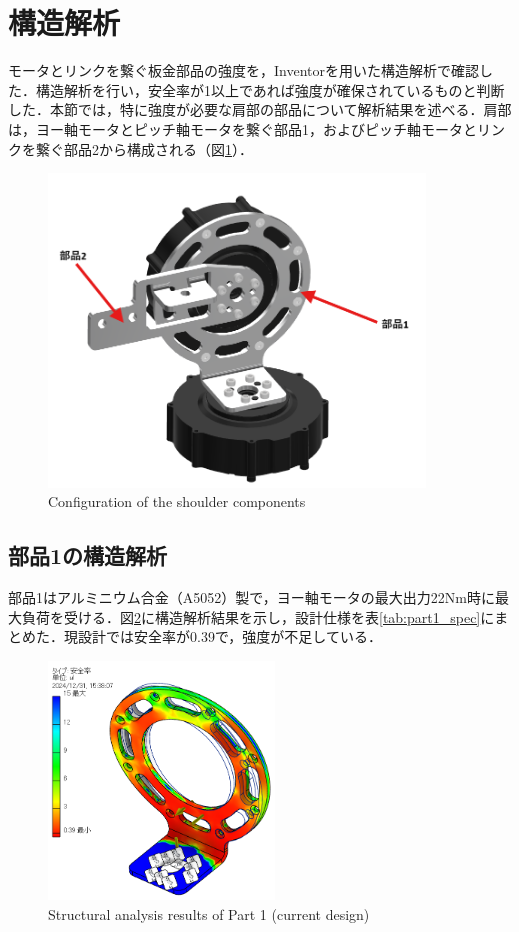 \section{構造解析}
モータとリンクを繋ぐ板金部品の強度を，Inventorを用いた構造解析で確認した．構造解析を行い，安全率が1以上であれば強度が確保されているものと判断した．本節では，特に強度が必要な肩部の部品について解析結果を述べる．肩部は，ヨー軸モータとピッチ軸モータを繋ぐ部品1，およびピッチ軸モータとリンクを繋ぐ部品2から構成される（図\ref{fig:shoulder}）．

\begin{figure}[h]
  \centering
  \includegraphics[width=10cm]{images/design/shoulder.png}
  \caption{Configuration of the shoulder components}
  \label{fig:shoulder}
\end{figure}

\subsection{部品1の構造解析}
部品1はアルミニウム合金（A5052）製で，ヨー軸モータの最大出力22Nm時に最大負荷を受ける．図\ref{fig:T3_40}に構造解析結果を示し，設計仕様を表\ref{tab:part1_spec}にまとめた．現設計では安全率が0.39で，強度が不足している．

\begin{figure}[h]
  \centering
  \includegraphics[width=6cm]{images/design/T3_40.png}
  \caption{Structural analysis results of Part 1 (current design)}
  \label{fig:T3_40}
\end{figure}

